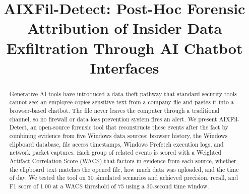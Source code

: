 \documentclass[conference]{IEEEtran}
\begin{document}

\title{AIXFil-Detect: Post-Hoc Forensic Attribution of Insider Data
       Exfiltration Through AI Chatbot Interfaces}

\author{%
  \and
}

\maketitle


\begin{abstract}
Generative AI tools have introduced a data theft pathway that standard
security tools cannot see: an employee copies sensitive text from a
company file and pastes it into a browser-based chatbot. The file never
leaves the computer through a traditional channel, so no firewall or
data loss prevention system fires an alert. We present AIXFil-Detect,
an open-source forensic tool that reconstructs these events after the
fact by combining evidence from five Windows data sources: browser
history, the Windows clipboard database, file access timestamps, Windows
Prefetch execution logs, and network packet captures. Each group of
related events is scored with a Weighted Artifact Correlation Score
(WACS) that factors in evidence from each source, whether the clipboard
text matches the opened file, how much data was uploaded, and the time
of day. We tested the tool on 30 simulated scenarios and achieved
precision, recall, and F1 score of 1.00 at a WACS threshold of 75 using
a 30-second time window.
\end{abstract}
\end{document}
